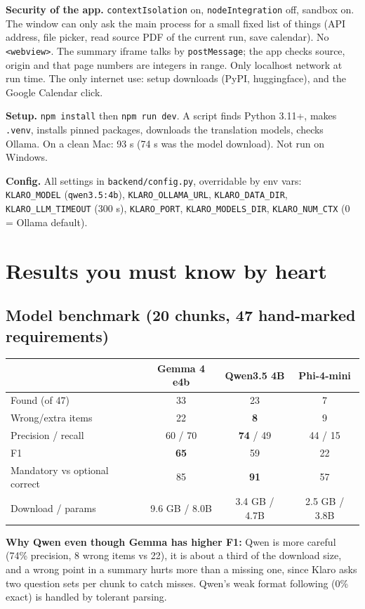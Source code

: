 \textbf{Security of the app.} \texttt{contextIsolation} on, \texttt{nodeIntegration} off, sandbox on. The window can only ask the main process for a small fixed list of things (API address, file picker, read source PDF of the current run, save calendar). No \texttt{<webview>}. The summary iframe talks by \texttt{postMessage}; the app checks source, origin and that page numbers are integers in range. Only localhost network at run time. The only internet use: setup downloads (PyPI, huggingface), and the Google Calendar click.

\textbf{Setup.} \texttt{npm install} then \texttt{npm run dev}. A script finds Python 3.11+, makes \texttt{.venv}, installs pinned packages, downloads the translation models, checks Ollama. On a clean Mac: 93 s (74 s was the model download). Not run on Windows.

\textbf{Config.} All settings in \texttt{backend/config.py}, overridable by env vars: \texttt{KLARO\_MODEL} (\texttt{qwen3.5:4b}), \texttt{KLARO\_OLLAMA\_URL}, \texttt{KLARO\_DATA\_DIR}, \texttt{KLARO\_LLM\_TIMEOUT} (300 s), \texttt{KLARO\_PORT}, \texttt{KLARO\_MODELS\_DIR}, \texttt{KLARO\_NUM\_CTX} (0 = Ollama default).

\section{Results you must know by heart}
\subsection{Model benchmark (20 chunks, 47 hand-marked requirements)}
\begin{tabularx}{\linewidth}{@{}Lccc@{}}\toprule
 & Gemma 4 e4b & \textbf{Qwen3.5 4B} & Phi-4-mini\\\midrule
Found (of 47) & 33 & 23 & 7\\
Wrong/extra items & 22 & \textbf{8} & 9\\
Precision / recall & 60 / 70 & \textbf{74} / 49 & 44 / 15\\
F1 & \textbf{65} & 59 & 22\\
Mandatory vs optional correct & 85 & \textbf{91} & 57\\
Download / params & 9.6 GB / 8.0B & 3.4 GB / 4.7B & 2.5 GB / 3.8B\\\bottomrule
\end{tabularx}

\textbf{Why Qwen even though Gemma has higher F1:} Qwen is more careful (74\% precision, 8 wrong items vs 22), it is about a third of the download size, and a wrong point in a summary hurts more than a missing one, since Klaro asks two question sets per chunk to catch misses. Qwen's weak format following (0\% exact) is handled by tolerant parsing.

